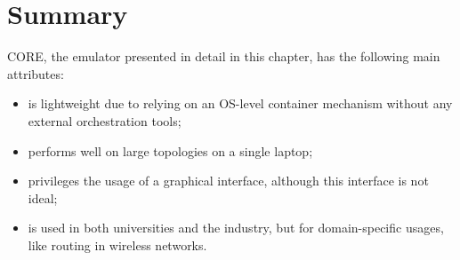 \section{Summary}
\label{sec:coresummary}

CORE, the emulator presented in detail in this chapter, has the following main attributes:
\begin{itemize}
  \item is lightweight due to relying on an OS-level container mechanism without any external orchestration tools;
  \item performs well on large topologies on a single laptop;
  \item privileges the usage of a graphical interface, although this interface is not ideal;
  \item is used in both universities and the industry, but for domain-specific usages, like routing in wireless networks.
\end{itemize}

